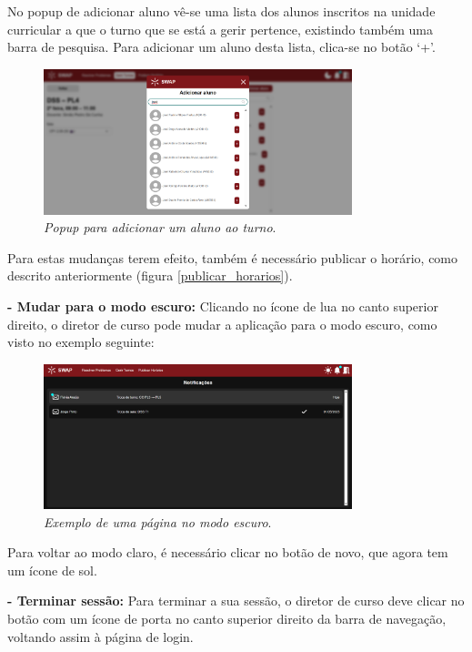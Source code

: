 \documentclass[12pt, a4paper]{article}
\begin{document}
No popup de adicionar aluno vê-se uma lista dos alunos inscritos na unidade curricular
a que o turno que se está a gerir pertence, existindo também uma barra de pesquisa.
Para adicionar um aluno desta lista, clica-se no botão ‘+’.

\begin{figure}[H]
    \centering
    \includegraphics[width=0.8\textwidth]{res/manual/adicionar_aluno.png}
    \caption{\emph{Popup para adicionar um aluno ao turno}.}
    \label{adicionar_aluno}
\end{figure}

Para estas mudanças terem efeito, também é necessário publicar o horário,
como descrito anteriormente (figura \ref{publicar_horarios}).

\textbf{- Mudar para o modo escuro:}
Clicando no ícone de lua no canto superior direito, o diretor de curso pode mudar a aplicação
para o modo escuro, como visto no exemplo seguinte:

\begin{figure}[H]
    \centering
    \includegraphics[width=0.8\textwidth]{res/manual/modo_escuro_diretor.png}
    \caption{\emph{Exemplo de uma página no modo escuro}.}
    \label{modo_escuro_diretor}
\end{figure}

Para voltar ao modo claro, é necessário clicar no botão de novo, que agora tem um ícone de sol.

\textbf{- Terminar sessão:}
Para terminar a sua sessão, o diretor de curso deve clicar no botão com um ícone de porta
no canto superior direito da barra de navegação, voltando assim à página de login.
\end{document}
